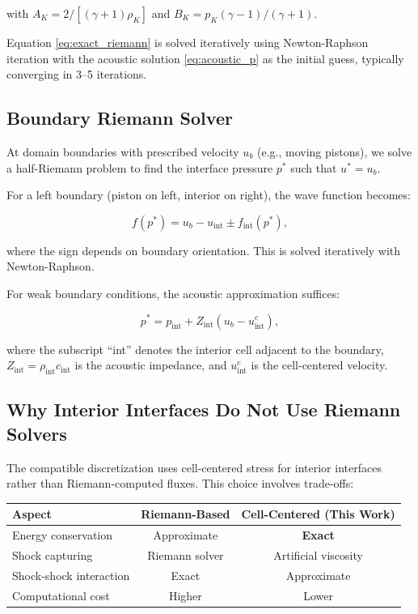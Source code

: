 \documentclass[12pt,a4paper]{article}
\begin{document}
\noindent with $A_K = 2/[(\gamma+1)\rho_K]$ and $B_K = p_K(\gamma-1)/(\gamma+1)$.

Equation \eqref{eq:exact_riemann} is solved iteratively using Newton-Raphson iteration with the acoustic solution \eqref{eq:acoustic_p} as the initial guess, typically converging in 3--5 iterations.

\subsection{Boundary Riemann Solver}

At domain boundaries with prescribed velocity $u_b$ (e.g., moving pistons), we solve a half-Riemann problem to find the interface pressure $p^*$ such that $u^* = u_b$.

For a left boundary (piston on left, interior on right), the wave function becomes:

\begin{equation}
    f(p^*) = u_b - u_{\text{int}} \pm f_{\text{int}}(p^*),
\end{equation}

\noindent where the sign depends on boundary orientation. This is solved iteratively with Newton-Raphson.

For weak boundary conditions, the acoustic approximation suffices:

\begin{equation}
    p^* = p_{\text{int}} + Z_{\text{int}} (u_b - u_{\text{int}}^c),
    \label{eq:boundary_riemann}
\end{equation}

\noindent where the subscript ``int'' denotes the interior cell adjacent to the boundary, $Z_{\text{int}} = \rho_{\text{int}} c_{\text{int}}$ is the acoustic impedance, and $u_{\text{int}}^c$ is the cell-centered velocity.

\subsection{Why Interior Interfaces Do Not Use Riemann Solvers}

The compatible discretization uses cell-centered stress for interior interfaces rather than Riemann-computed fluxes. This choice involves trade-offs:

\begin{center}
\begin{tabular}{lcc}
\toprule
\textbf{Aspect} & \textbf{Riemann-Based} & \textbf{Cell-Centered (This Work)} \\
\midrule
Energy conservation & Approximate & \textbf{Exact} \\
Shock capturing & Riemann solver & Artificial viscosity \\
Shock-shock interaction & Exact & Approximate \\
Computational cost & Higher & Lower \\
\bottomrule
\end{tabular}
\end{center}
\end{document}
